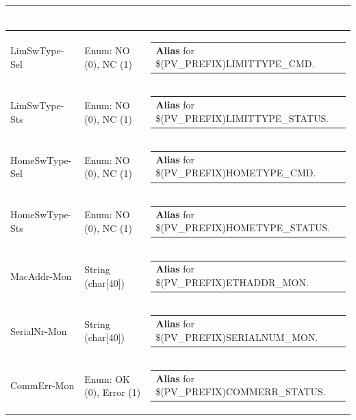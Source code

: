 \documentclass[openany]{article}
\begin{document}
\begin{longtable}{| m{4.5cm} m{2.5cm}  m{8.5cm} |}
\begin{tabular}{@{}m{6cm}@{}}
            \end{tabular} \hypertarget{pv:lim-sw-type}{}\\ \hline
        LimSwType-Sel & Enum: NO (0), NC (1) & \begin{tabular}{@{}m{6cm}@{}}
                \textbf{\color{blue} Alias} for \$(PV\_PREFIX)LIMITTYPE\_CMD.
            \end{tabular} \hypertarget{}{}\\ \hline
        LimSwType-Sts & Enum: NO (0), NC (1) & \begin{tabular}{@{}m{6cm}@{}}
                \textbf{\color{blue} Alias} for \$(PV\_PREFIX)LIMITTYPE\_STATUS.
            \end{tabular} \hypertarget{pv:home-sw-type}{}\\ \hline
        HomeSwType-Sel & Enum: NO (0), NC (1) & \begin{tabular}{@{}m{6cm}@{}}
                \textbf{\color{blue} Alias} for \$(PV\_PREFIX)HOMETYPE\_CMD.
            \end{tabular} \hypertarget{}{}\\ \hline
        HomeSwType-Sts & Enum: NO (0), NC (1) & \begin{tabular}{@{}m{6cm}@{}}
                \textbf{\color{blue} Alias} for \$(PV\_PREFIX)HOMETYPE\_STATUS.
            \end{tabular} \hypertarget{pv:mac-addr-mon}{}\\ \hline
        MacAddr-Mon & String (char[40]) & \begin{tabular}{@{}m{6cm}@{}}
                \textbf{\color{blue} Alias} for \$(PV\_PREFIX)ETHADDR\_MON.
            \end{tabular} \hypertarget{pv:serial-nr-mon}{}\\ \hline
        SerialNr-Mon & String (char[40]) & \begin{tabular}{@{}m{6cm}@{}}
                \textbf{\color{blue} Alias} for \$(PV\_PREFIX)SERIALNUM\_MON.
            \end{tabular} \hypertarget{pv:comm-err-mon}{}\\ \hline
        CommErr-Mon & Enum: OK (0), Error (1) & \begin{tabular}{@{}m{6cm}@{}}
                \textbf{\color{blue} Alias} for \$(PV\_PREFIX)COMMERR\_STATUS.
            \end{tabular} \hypertarget{pv:controller-start-mon}{}\\ \hline

\end{longtable}
\end{document}
